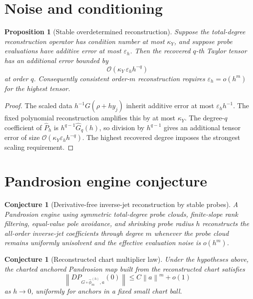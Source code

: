 \documentclass[11pt]{article}
\newtheorem{proposition}[definition]{Proposition}
\newtheorem{conjecture}[definition]{Conjecture}
\newcommand{\Oterm}{\mathcal O}
\newcommand{\norm}[1]{\left\lVert #1\right\rVert}
\begin{document}
\section{Noise and conditioning}

\begin{proposition}[Stable overdetermined reconstruction]\label{prop:noise}
Suppose the total-degree reconstruction operator has condition number at most \(\kappa_Y\), and suppose probe evaluations have additive error at most \(\varepsilon_h\). Then the recovered \(q\)-th Taylor tensor has an additional error bounded by
\[
        \Oterm(\kappa_Y\,\varepsilon_h h^{-q})
\]
at order \(q\). Consequently consistent order-\(m\) reconstruction requires \(\varepsilon_h=o(h^m)\) for the highest tensor.
\end{proposition}

\begin{proof}
The scaled data \(h^{-1}G(\rho+h y_j)\) inherit additive error at most \(\varepsilon_h h^{-1}\). The fixed polynomial reconstruction amplifies this by at most \(\kappa_Y\). The degree-\(q\) coefficient of \(\widehat P_h\) is \(h^{q-1}\widehat G_q(h)\), so division by \(h^{q-1}\) gives an additional tensor error of size \(\Oterm(\kappa_Y\varepsilon_h h^{-q})\). The highest recovered degree imposes the strongest scaling requirement.
\end{proof}

\section{Pandrosion engine conjecture}

\begin{conjecture}[Derivative-free inverse-jet reconstruction by stable probes]
A Pandrosion engine using symmetric total-degree probe clouds, finite-slope rank filtering, equal-value pole avoidance, and shrinking probe radius \(h\) reconstructs the all-order inverse-jet coefficients through degree \(m\) whenever the probe cloud remains uniformly unisolvent and the effective evaluation noise is \(o(h^m)\).
\end{conjecture}

\begin{conjecture}[Reconstructed chart multiplier law]
Under the hypotheses above, the charted anchored Pandrosion map built from the reconstructed chart satisfies
\[
        \norm{D P_{G\circ\widehat\phi_m^{(h)},a}(0)}
        \le
        C\norm{a}^m+o(1)
\]
as \(h\to0\), uniformly for anchors in a fixed small chart ball.
\end{conjecture}
\end{document}
